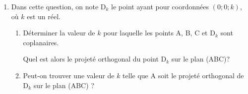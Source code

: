 \begin{enumerate}
		\item Dans cette question, on note $\mathrm{D}_{k}$ le point ayant pour coordonnées $(0 ; 0 ; k)$, où $k$ est un réel.
		\begin{enumerate}
			\item Déterminer la valeur de $k$ pour laquelle les points A, B, C et $\mathrm{D}_{k}$ sont coplanaires.

			Quel est alors le projeté orthogonal du point D$_{k}$ sur le plan (ABC)?

			\item Peut-on trouver une valeur de $k$ telle que A soit le projeté orthogonal de $\mathrm{D}_{k}$ sur le plan (ABC) ?
		\end{enumerate}
	\end{enumerate}
